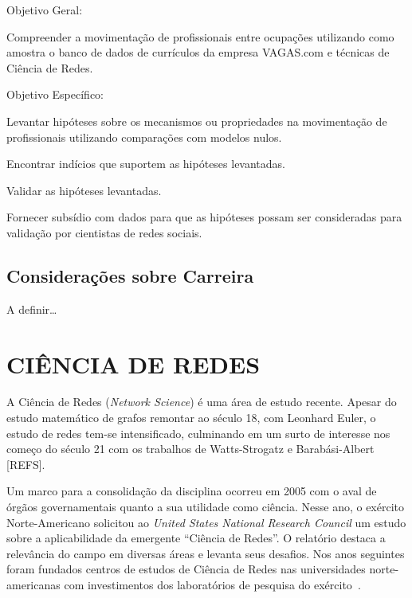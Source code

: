 \documentclass[12pt,a4paper]{article}
\theoremstyle{hypo}
\begin{document}
    
Objetivo Geral:

Compreender a movimentação de profissionais entre ocupações utilizando como amostra o banco de dados de currículos da empresa VAGAS.com e técnicas de Ciência de Redes.

Objetivo Específico:

Levantar hipóteses sobre os mecanismos ou propriedades na movimentação de profissionais utilizando comparações com modelos nulos.

Encontrar indícios que suportem as hipóteses levantadas.

Validar as hipóteses levantadas.

Fornecer subsídio com dados para que as hipóteses possam ser consideradas para validação por cientistas de redes sociais.

\subsection{Considerações sobre Carreira}

A definir\ldots


\section{CIÊNCIA DE REDES}

A Ciência de Redes (\textit{Network Science}) é uma área de estudo recente. Apesar do estudo matemático de grafos remontar ao século 18, com Leonhard Euler, o estudo de redes tem-se intensificado, culminando em um surto de interesse nos começo do século 21 com os trabalhos de Watts-Strogatz e Barabási-Albert [{REFS}].

Um marco para a consolidação da disciplina ocorreu em 2005 com o aval de órgãos governamentais quanto a sua utilidade como ciência. Nesse ano, o exército Norte-Americano solicitou ao \textit{United States National Research Council} um estudo sobre a aplicabilidade da emergente \enquote{Ciência de Redes}. O relatório destaca a relevância do campo em diversas áreas e levanta seus desafios. Nos anos seguintes foram fundados centros de estudos de Ciência de Redes nas universidades norte-americanas com investimentos dos laboratórios de pesquisa do exército~\cite{Maxwell2009-kq}.
\end{document}
